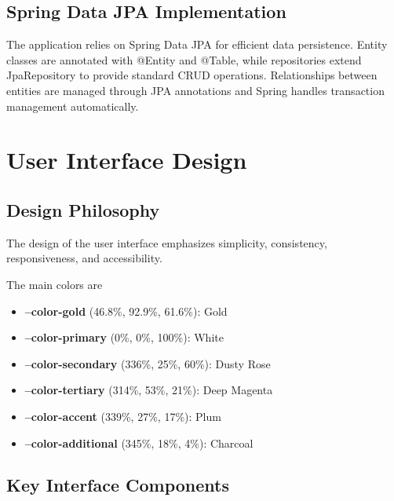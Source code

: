 \subsection{Spring Data JPA Implementation}\label{subsec:spring-data-jpa}

The application relies on Spring Data JPA for efficient data persistence.
Entity classes are annotated with @Entity and @Table, while repositories extend JpaRepository to provide standard CRUD operations.
Relationships between entities are managed through JPA annotations and Spring handles transaction management automatically.

\section{User Interface Design}\label{sec:ui-design}

\subsection{Design Philosophy}\label{subsec:design-philosophy}
The design of the user interface emphasizes simplicity, consistency, responsiveness, and accessibility.



The main colors are
\begin{itemize}
    \item \textcolor{colorGold}{\textbf{--color-gold} (46.8\%, 92.9\%, 61.6\%): Gold}
    \item \textbf{--color-primary} (0\%, 0\%, 100\%): White
    \item \textcolor{colorSecondary}{\textbf{--color-secondary} (336\%, 25\%, 60\%): Dusty Rose}
    \item \textcolor{colorTertiary}{\textbf{--color-tertiary} (314\%, 53\%, 21\%): Deep Magenta}
    \item \textcolor{colorAccent}{\textbf{--color-accent} (339\%, 27\%, 17\%): Plum}
    \item \textcolor{colorAdditional}{\textbf{--color-additional} (345\%, 18\%, 4\%): Charcoal}
\end{itemize}

\subsection{Key Interface Components}\label{subsec:interface-components}

